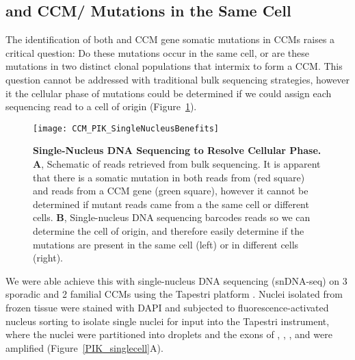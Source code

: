 \subsection{ and CCM/ Mutations in the Same Cell}
The identification of both  and CCM gene somatic mutations in CCMs raises a critical question: Do these mutations occur in the same cell, or are these mutations in two distinct clonal populations that intermix to form a CCM. This question cannot be addressed with traditional bulk sequencing strategies, however it the cellular phase of mutations could be determined if we could assign each sequencing read to a cell of origin (Figure~\ref{CCM_PIK_SingleNucleusBenefits}). 
\begin{figure}[tbp!]
\begin{center}
\texttt{[image: CCM\_PIK\_SingleNucleusBenefits]}
\end{center}
\caption[Single-Nucleus DNA Sequencing to Resolve Cellular Phase.] {\textbf{Single-Nucleus DNA Sequencing to Resolve Cellular Phase.} \\ \textbf{A}, Schematic of reads retrieved from bulk sequencing. It is apparent that there is a somatic mutation in both reads from  (red square) and reads from a CCM gene (green square), however it cannot be determined if mutant reads came from a the same cell or different cells. \textbf{B}, Single-nucleus DNA sequencing barcodes reads so we can determine the cell of origin, and therefore easily determine if the mutations are present in the same cell (left) or in different cells (right).}

\label{CCM_PIK_SingleNucleusBenefits}
\end{figure}
We were able achieve this with single-nucleus DNA sequencing (snDNA-seq) on 3 sporadic and 2 familial CCMs using the Tapestri platform \citep{xu2019}. Nuclei isolated from frozen tissue were stained with DAPI and subjected to fluorescence-activated nucleus sorting to isolate single nuclei for input into the Tapestri instrument, where the nuclei were partitioned into droplets and the exons of , , , and  were amplified (Figure~\ref{PIK_singlecell}A). 
